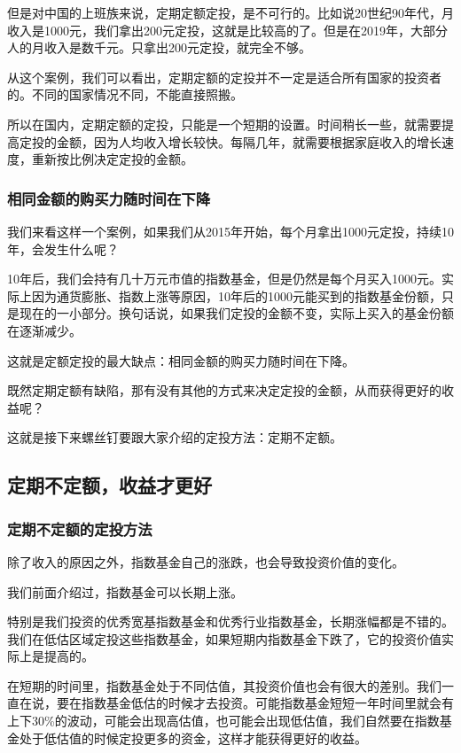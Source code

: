 但是对中国的上班族来说，定期定额定投，是不可行的。比如说20世纪90年代，月收入是1000元，我们拿出200元定投，这就是比较高的了。但是在2019年，大部分人的月收入是数千元。只拿出200元定投，就完全不够。

从这个案例，我们可以看出，定期定额的定投并不一定是适合所有国家的投资者的。不同的国家情况不同，不能直接照搬。

所以在国内，定期定额的定投，只能是一个短期的设置。时间稍长一些，就需要提高定投的金额，因为人均收入增长较快。每隔几年，就需要根据家庭收入的增长速度，重新按比例决定定投的金额。

\subsubsection{相同金额的购买力随时间在下降}

我们来看这样一个案例，如果我们从2015年开始，每个月拿出1000元定投，持续10年，会发生什么呢？

10年后，我们会持有几十万元市值的指数基金，但是仍然是每个月买入1000元。实际上因为通货膨胀、指数上涨等原因，10年后的1000元能买到的指数基金份额，只是现在的一小部分。换句话说，如果我们定投的金额不变，实际上买入的基金份额在逐渐减少。

这就是定额定投的最大缺点：相同金额的购买力随时间在下降。

既然定期定额有缺陷，那有没有其他的方式来决定定投的金额，从而获得更好的收益呢？

这就是接下来螺丝钉要跟大家介绍的定投方法：定期不定额。

\subsection{定期不定额，收益才更好}
\subsubsection{定期不定额的定投方法}

除了收入的原因之外，指数基金自己的涨跌，也会导致投资价值的变化。

我们前面介绍过，指数基金可以长期上涨。

特别是我们投资的优秀宽基指数基金和优秀行业指数基金，长期涨幅都是不错的。我们在低估区域定投这些指数基金，如果短期内指数基金下跌了，它的投资价值实际上是提高的。

在短期的时间里，指数基金处于不同估值，其投资价值也会有很大的差别。我们一直在说，要在指数基金低估的时候才去投资。可能指数基金短短一年时间里就会有上下30\%的波动，可能会出现高估值，也可能会出现低估值，我们自然要在指数基金处于低估值的时候定投更多的资金，这样才能获得更好的收益。

